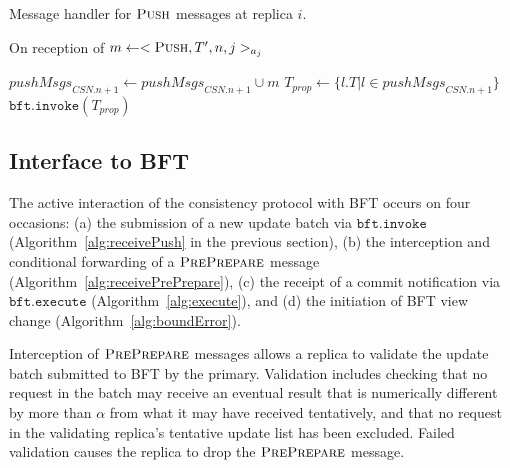 \documentclass[twocolumn,10pt]{article}
\begin{document}
{\begin{algorithm}
\small
\caption{Message handler for $\textsc{Push}$ messages at replica $i$.}
On reception of $m \leftarrow <\textsc{Push}, T', n, j>_{a_j}$
\begin{algorithmic}[1]\label{alg:receivePush}
\STATE $\mathit{pushMsgs}_{\mathit{CSN}.n+1} \leftarrow
\mathit{pushMsgs}_{\mathit{CSN}.n+1} \cup m$
\STATE $T_\mathit{prop} \leftarrow \{l.T | l \in
    \mathit{pushMsgs}_{\mathit{CSN}.n+1}\}$ \label{lin:combinePushOrdering}
\STATE $\mathtt{bft.invoke}(T_\mathit{prop})$ 
       \label{lin:bftInvoke}
\ENDIF
\ENDIF
\ENDIF
\end{algorithmic}
\end{algorithm}

\subsection{Interface to BFT}

The active interaction of the consistency protocol with BFT occurs on
four occasions: (a) the submission of a new update batch via
$\mathtt{bft.invoke}$ (Algorithm~\ref{alg:receivePush} in the previous section), (b) the
interception and conditional forwarding of a $\textsc{PrePrepare}$ message
(Algorithm~\ref{alg:receivePrePrepare}), (c) the receipt of a commit
notification via $\mathtt{bft.execute}$
(Algorithm~\ref{alg:execute}), and (d) the initiation of BFT view
change (Algorithm~\ref{alg:boundError}). 

Interception of $\textsc{PrePrepare}$ messages allows a replica to validate
the update batch submitted to BFT by the primary. Validation includes
checking that no request in the batch may receive an eventual result
that is numerically different by more than $\alpha$ from what it may
have received tentatively, and that no request in the validating
replica's tentative update list has been excluded.  Failed validation
causes the replica to drop the $\textsc{PrePrepare}$ message.

}
\end{document}
